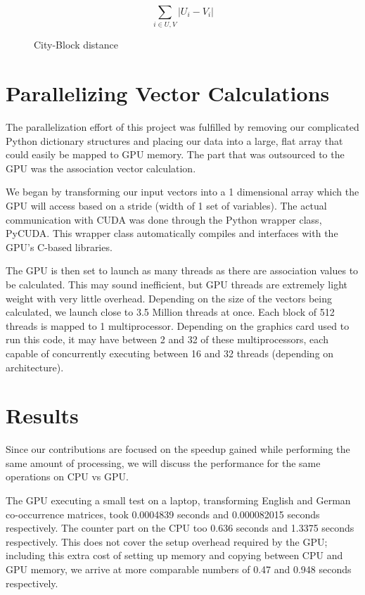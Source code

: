 \documentclass[12pt]{article}
\begin{document}
\begin{figure}
$$\sum_{i\in U,V} |U_i - V_i| $$
\caption{City-Block distance}
  \label{cityblock}
\end{figure}

\section{Parallelizing Vector Calculations}

The parallelization effort of this project was fulfilled by removing our complicated Python dictionary structures and placing our data into a large, flat array that could easily be mapped to GPU memory. The part that was outsourced to the GPU was the association vector calculation.

We began by transforming our input vectors into a 1 dimensional array which the GPU will access based on a stride (width of 1 set of variables). The actual communication with CUDA was done through the Python wrapper class, PyCUDA. This wrapper class automatically compiles and interfaces with the GPU's C-based libraries.

The GPU is then set to launch as many threads as there are association values to be calculated. This may sound inefficient, but GPU threads are extremely light weight with very little overhead. Depending on the size of the vectors being calculated, we launch close to 3.5 Million threads at once. Each block of 512 threads is mapped to 1 multiprocessor. Depending on the graphics card used to run this code, it may have between 2 and 32 of these multiprocessors, each capable of concurrently executing between 16 and 32 threads (depending on architecture).

\section{Results}

Since our contributions are focused on the speedup gained while performing the same amount of processing, we will discuss the performance for the same operations on CPU vs GPU.

The GPU executing a small test on a laptop, transforming English and German co-occurrence matrices, took 0.0004839 seconds and 0.000082015 seconds respectively. The counter part on the CPU too 0.636 seconds and 1.3375 seconds respectively. This does not cover the setup overhead required by the GPU; including this extra cost of setting up memory and copying between CPU and GPU memory, we arrive at more comparable numbers of 0.47 and 0.948 seconds respectively.
\end{document}
